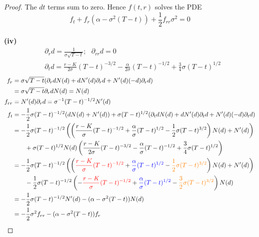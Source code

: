 \documentclass[a4paper, 10pt]{article}
\theoremstyle{definition}
\theoremstyle{hSol}
\begin{document}
\begin{proof}
The $dt$ terms sum to zero. Hence $f(t,r)$ solves the PDE
\begin{equation}\label{feq}
  f_t + f_r(\alpha  - \sigma^2(T-t)) + \frac{1}{2}f_{rr} \sigma^2 = 0
\end{equation}
~\\
\textbf{(iv)}
\begin{equation}
  \begin{split}
    &\partial_r d = \frac{1}{\sigma \sqrt{T-t}};~~~\partial_{rr}d = 0\\
    &\partial_t d = \frac{r-K}{2\sigma}(T-t)^{-3/2} - \frac{\alpha}{2\sigma}(T-t)^{-1/2} + \frac{3}{4}\sigma (T-t)^{1/2}
  \end{split}
\end{equation}
\begin{equation}
  \begin{split}
    f_r &= \sigma \sqrt{T-t} (\partial_rd N(d) + dN'(d)\partial_rd  + N'(d)(-d)\partial_r d )\\
      &= \sigma \sqrt{T-t} \partial_rd N(d) = N(d) \\
    f_{rr} &= N'(d)\partial_r d =  \sigma^{-1} (T-t)^{-1/2}N'(d)\\
    f_t &= -\frac{1}{2}\sigma(T-t)^{-1/2}(dN(d)+N'(d)) + \sigma(T-t)^{1/2}(\partial_td N(d) + dN'(d)\partial_td  + N'(d)(-d)\partial_t d ) \\
    &=-\frac{1}{2}\sigma(T-t)^{-1/2}\left(\left(\frac{r-K}{\sigma}(T-t)^{-1/2}+\frac{\alpha}{\sigma}(T-t)^{1/2}-\frac{1}{2}\sigma(T-t)^{3/2}\right)N(d)+N'(d)\right) \\
    &\qquad + \sigma(T-t)^{1/2} N(d) \left(\frac{r-K}{2\sigma}(T-t)^{-3/2} - \frac{\alpha}{\sigma}(T-t)^{-1/2} + \frac{3}{4}\sigma (T-t)^{1/2}\right) \\
    &=-\frac{1}{2}\sigma(T-t)^{-1/2}\left(\left(\textcolor{red}{\frac{r-K}{\sigma}(T-t)^{-1/2}}+\textcolor{blue}{\frac{\alpha}{\sigma}(T-t)^{1/2}}-\textcolor{orange}{\frac{1}{2}\sigma(T-t)^{3/2}}\right)N(d)+N'(d)\right) \\
    &\qquad - \frac{1}{2}\sigma(T-t)^{-1/2} \left(-\textcolor{red}{\frac{r-K}{\sigma}(T-t)^{-1/2}} + \textcolor{blue}{\frac{\alpha}{\sigma}(T-t)^{1/2}} - \textcolor{orange}{\frac{3}{2}\sigma (T-t)^{3/2}}\right)N(d)  \\
    &= - \frac{1}{2}\sigma(T-t)^{-1/2} N'(d) - (\alpha - \sigma^2(T-t))N(d) \\
    &= -\frac{1}{2}\sigma^2 f_{rr} - (\alpha - \sigma^2(T-t))f_{r}
  \end{split}
\end{equation}

\end{proof}
\end{document}

